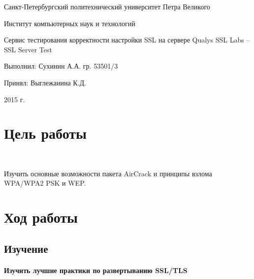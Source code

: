 \documentclass{article}
\begin{document}
\begin{titlepage} \begin{center}

	\Large			
Санкт-Петербургский политехнический университет Петра Великого
			
	\vspace{0.2cm}	
Институт компьютерных наук и технологий
		
	\vspace{2cm} \vfill \huge
Сервис тестирования корректности настройки SSL на сервере Qualys SSL Labs – SSL Server Test
		
	\vfill 
	\begin{flushleft} \large \hangindent=8cm 
Выполнил: Сухинин А.А. гр. 53501/3 \hrulefill
			
Принял: Выглежанина К.Д. \hrulefill
	\end{flushleft}
		
	\vspace{2cm} \vfill \LARGE
2015 г.
		
\end{center} \end{titlepage}

\section{Цель работы}
~

Изучить основные возможности пакета AirCrack и принципы взлома WPA/WPA2 PSK и WEP.

\section{Ход работы}
\subsection{Изучение}

\paragraph{Изучить лучшие практики по развертыванию SSL/TLS}
\end{document}
